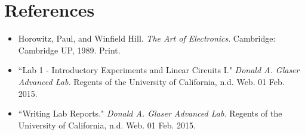 \documentclass[authoryear, 12pt,5p, times]{elsarticle}
\begin{document}
  \section*{References}
 \begin{footnotesize}
 \begin{itemize}
 \item Horowitz, Paul, and Winfield Hill. \textit{The Art of Electronics}. Cambridge: Cambridge UP, 1989. Print.
 \item ``Lab 1 - Introductory Experiments and Linear Circuits I." \textit{Donald A. Glaser Advanced Lab.} Regents of the University of California, n.d. Web. 01 Feb. 2015.
  \item ``Writing Lab Reports." \textit{Donald A. Glaser Advanced Lab.} Regents of the University of California, n.d. Web. 01 Feb. 2015.
\end{itemize}
% 
%
  \end{footnotesize}
\end{document}
